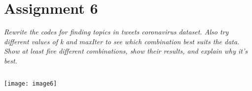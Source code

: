 \documentclass[]{article}
\begin{document}
\section*{Assignment 6}
\emph{ Rewrite the codes for finding topics in tweets coronavirus dataset.  Also try different values of k and maxIter to see which combination best suits the data. Show at least five different combinations, show their results, and explain why it’s best.
 }

\begin{verbatim}

\end{verbatim}
\texttt{[image: image6]} %
\end{document}
